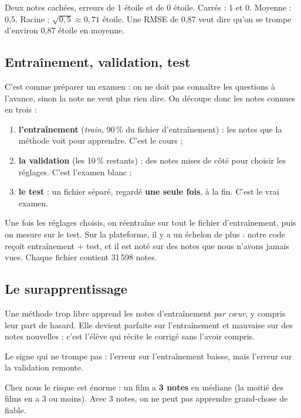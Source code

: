 \documentclass[11pt,a4paper]{article}
\begin{document}
\begin{exemple}
Deux notes cachées, erreurs de 1 étoile et de 0 étoile. Carrés : 1 et 0.
Moyenne : 0,5. Racine : $\sqrt{0{,}5} \approx 0{,}71$ étoile.
Une RMSE de 0,87 veut dire qu'on se trompe d'environ 0,87 étoile en moyenne.
\end{exemple}

\subsection{Entraînement, validation, test}

C'est comme préparer un examen : on ne doit pas connaître les questions à l'avance,
sinon la note ne veut plus rien dire. On découpe donc les notes connues en trois :
\begin{enumerate}
  \item \textbf{l'entraînement} (\emph{train}, 90\,\% du fichier d'entraînement) :
        les notes que la méthode voit pour apprendre. C'est le cours ;
  \item \textbf{la validation} (les 10\,\% restants) : des notes mises de côté pour
        choisir les réglages. C'est l'examen blanc ;
  \item \textbf{le test} : un fichier séparé, regardé \textbf{une seule fois}, à la fin.
        C'est le vrai examen.
\end{enumerate}
Une fois les réglages choisis, on réentraîne sur tout le fichier d'entraînement, puis on
mesure sur le test. Sur la plateforme, il y a un échelon de plus : notre code reçoit
entraînement + test, et il est noté sur des notes que nous n'avons jamais vues.
Chaque fichier contient 31\,598 notes.

\subsection{Le surapprentissage}

Une méthode trop libre apprend les notes d'entraînement \emph{par c\oe ur}, y compris
leur part de hasard. Elle devient parfaite sur l'entraînement et mauvaise sur des notes
nouvelles : c'est l'élève qui récite le corrigé sans l'avoir compris.

Le signe qui ne trompe pas : l'erreur sur l'entraînement baisse, mais l'erreur sur la
validation remonte.

Chez nous le risque est énorme : un film a \textbf{3 notes} en médiane (la moitié des
films en a 3 ou moins). Avec 3 notes, on ne peut pas apprendre grand-chose de fiable.
\end{document}
